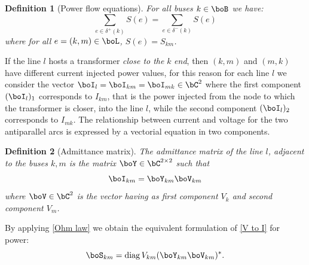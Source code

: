 \documentclass[11pt,a4paper,oneside,openany]{book}
\DeclareMathOperator{\diag}{diag}
\newtheorem{definition}{Definition}
\numberwithin{definition}{section}
\numberwithin{theorem}{section}
\numberwithin{problem}{section}
\begin{document}
\begin{definition}[Power flow equations]
    For all buses $k \in \boB$ we have:
\begin{equation}\label{Power flow equations}
     \sum_{e \in \delta^+(k)}S(e) = \sum_{e \in \delta^-(k)}S(e)
\end{equation}
where for all $e = (k,m) \in \boL$, $S(e) = S_{km}$.
\end{definition}


If the line $l$ hosts a transformer \emph{close to the} $k$ \emph{end}, then $(k,m)$ and $(m,k)$ have different current injected power values, for this reason for each line $l$ we consider the vector $\boI_l = \boI_{km} = \boI_{mk} \in \bC^2$ where the first component \((\boI_l)_1\) corresponds to $I_{km}$, that is the power injected from the node to which the transformer is closer, into the line $l$, while the second component \((\boI_l)_2\) corresponds to $I_{mk}$. The relationship between current and voltage for the two antiparallel arcs is expressed by a vectorial equation in two components.
\begin{definition}[Admittance matrix]
The admittance matrix of the line $l$, adjacent to the buses $k,m$ is the matrix $\boY \in \bC^{2\times 2}$ such that
\begin{equation} \label{V to I}
    \boI_{km} = \boY_{km}\boV_{km}
\end{equation}
    where $\boV \in \bC^2$ is the vector having as first component $V_k$ and second component $V_m$.
\end{definition}
By applying \eqref{Ohm law} we obtain the equivalent formulation of \eqref{V to I} for power:
\begin{equation}
    \boS_{km} = \diag{V_{km}}(\boY_{km}\boV_{km})^*.
\end{equation}
\end{document}
